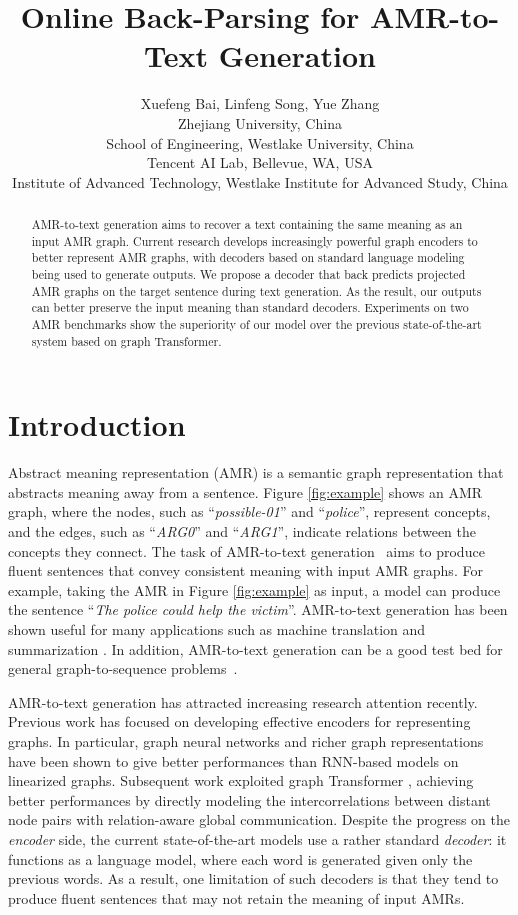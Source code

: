 \documentclass[11pt,a4paper]{article}
\title{{O}nline {B}ack-{P}arsing for {A}MR-to-{T}ext {G}eneration}
\author{
	Xuefeng Bai\hspace{0.5mm}, 
	Linfeng Song\hspace{0.5mm}, 
	Yue Zhang\hspace{0.2mm} \\
	 Zhejiang University, China \\
	School of Engineering, Westlake University, China \\
	 Tencent AI Lab, Bellevue, WA, USA \\
	Institute of Advanced Technology, Westlake Institute for Advanced Study, China\\	
}
\date{}
\begin{document}
\maketitle
\begin{abstract}
	AMR-to-text generation aims to recover a text containing the same meaning as an input AMR graph.
    Current research develops increasingly powerful graph encoders to better represent AMR graphs, with decoders based on standard language modeling being used to generate outputs.
    We propose a decoder that back predicts projected AMR graphs on the target sentence during text generation.
	As the result, our outputs can better preserve the input meaning than standard decoders.
	Experiments on two AMR benchmarks show the superiority of our model over the previous state-of-the-art system based on graph Transformer.
\end{abstract}

\section{Introduction}


Abstract meaning representation (AMR) \cite{banarescu2013abstract} is a semantic graph representation that abstracts meaning away from a sentence.
Figure \ref{fig:example} shows an AMR graph, where the nodes, such as ``\emph{possible-01}'' and ``\emph{police}'', represent concepts, and the edges, such as ``\emph{ARG0}'' and ``\emph{ARG1}'', indicate  relations between the concepts  they connect. The task of AMR-to-text generation~\cite{konstas2017neural} aims to produce fluent sentences that convey consistent meaning with input AMR graphs.
For example, taking the AMR in Figure \ref{fig:example} as input, a model can produce the sentence ``\emph{The police could help the victim}''.
AMR-to-text generation has been shown useful for many applications such as machine translation \cite{song2019semantic} and summarization \cite{liu2015toward,yasunaga2017graph,liao2018abstract,hardy2018guided}.
In addition, AMR-to-text generation can be a good test bed for general graph-to-sequence problems~\cite{belz2011first,gardent2017webnlg}.


AMR-to-text generation has attracted increasing research attention recently. Previous work has focused on developing effective encoders for representing graphs.
In particular, graph neural networks \cite{beck2018graph,song2018graph,guo-etal-2019-densely} and richer graph representations \cite{damonte2019structural,hajdik2019neural,ribeiro2019enhancing} have been shown to give better performances than RNN-based models \cite{konstas2017neural} on linearized graphs.
Subsequent work exploited graph Transformer \cite{zhu2019modeling,cai2020graph,wang2020amr}, achieving better performances by directly modeling the intercorrelations between distant node pairs with relation-aware global communication.
Despite the progress on the {\it encoder} side, the current state-of-the-art models use a rather standard {\it decoder}: it functions as a language model, where each word is generated given only the previous words.
As a result, one limitation of such decoders is that they tend to produce fluent sentences that may not retain the meaning of input AMRs.
\end{document}
